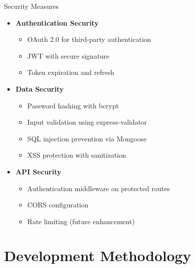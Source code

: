 \documentclass{beamer}
\begin{document}
\begin{frame}{Security Measures}
\begin{itemize}
    \item \textbf{Authentication Security}
    \begin{itemize}
        \item OAuth 2.0 for third-party authentication
        \item JWT with secure signature
        \item Token expiration and refresh
    \end{itemize}
    
    \item \textbf{Data Security}
    \begin{itemize}
        \item Password hashing with bcrypt
        \item Input validation using express-validator
        \item SQL injection prevention via Mongoose
        \item XSS protection with sanitization
    \end{itemize}
    
    \item \textbf{API Security}
    \begin{itemize}
        \item Authentication middleware on protected routes
        \item CORS configuration
        \item Rate limiting (future enhancement)
    \end{itemize}
\end{itemize}
\end{frame}

\section{Development Methodology}
\end{document}
